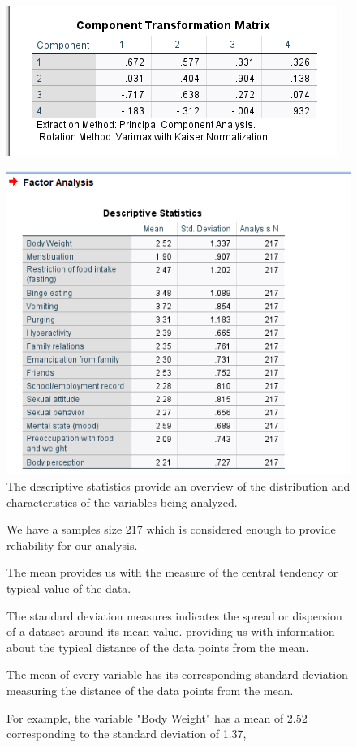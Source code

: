 \documentclass[english,10pt,a4paper]{article}
\begin{document}

\begin{figure}
	\includegraphics[width=1\linewidth]{component tranformation matrix.png}
\end{figure}

\begin{figure}[h]
	
	\includegraphics[width=1\linewidth]{Descriptives.png}
	The descriptive statistics provide an overview of the distribution and characteristics of the variables being analyzed.
	
	We have a samples size 217 which is considered enough to provide reliability for our analysis.
	
	The mean provides us with the measure of the central tendency or typical value of the data.
	
	The standard deviation  measures indicates the spread or dispersion of a dataset around its mean value. providing us with information about the typical distance of the data points from the mean.
	
	The mean of every variable has its corresponding standard deviation measuring the distance of the data points from the mean. 
	
	For example, the variable "Body Weight" has a mean of 2.52 corresponding to the standard deviation of 1.37, 
	

\end{figure}
\end{document}
